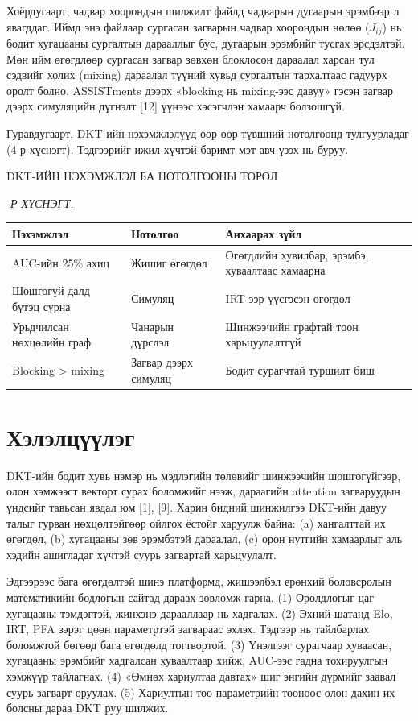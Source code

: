 \documentclass[10pt,twocolumn]{article}
\newcommand{\tabtitle}[1]{\refstepcounter{table}%
  {\centering\small\MakeUppercase{#1}\par}%
  {\raggedleft\small\itshape\thetable-Р ХҮСНЭГТ.\par}\vspace{2pt}}
\begin{document}
Хоёрдугаарт, чадвар хоорондын шилжилт файлд чадварын дугаарын эрэмбээр л явагддаг. Иймд энэ
файлаар сургасан загварын чадвар хоорондын нөлөө ($J_{ij}$) нь бодит хугацааны сургалтын
дарааллыг бус, дугаарын эрэмбийг тусгах эрсдэлтэй. Мөн ийм өгөгдлөөр сургасан загвар зөвхөн
блоклосон дараалал харсан тул сэдвийг холих (mixing) дараалал түүний хувьд сургалтын тархалтаас
гадуурх оролт болно. ASSISTments дээрх «blocking нь mixing-ээс давуу» гэсэн загвар дээрх
симуляцийн дүгнэлт [12] үүнээс хэсэгчлэн хамаарч болзошгүй.

Гуравдугаарт, DKT-ийн нэхэмжлэлүүд өөр өөр түвшний нотолгоонд тулгуурладаг (4-р хүснэгт).
Тэдгээрийг ижил хүчтэй баримт мэт авч үзэх нь буруу.

\begin{table}[t]
\tabtitle{DKT-ийн нэхэмжлэл ба нотолгооны төрөл}
\centering\small
\begin{tabular}{|L{2.2cm}|L{1.8cm}|L{3.0cm}|}
\hline
\textbf{Нэхэмжлэл} & \textbf{Нотолгоо} & \textbf{Анхаарах зүйл}\\\hline
AUC-ийн 25\% ахиц & Жишиг өгөгдөл & Өгөгдлийн хувилбар, эрэмбэ, хуваалтаас хамаарна\\\hline
Шошгогүй далд бүтэц сурна & Симуляц & IRT-ээр үүсгэсэн өгөгдөл\\\hline
Урьдчилсан нөхцөлийн граф & Чанарын дүрслэл & Шинжээчийн графтай тоон харьцуулалтгүй\\\hline
Blocking > mixing & Загвар дээрх симуляц & Бодит сурагчтай туршилт биш\\\hline
\end{tabular}
\end{table}

\section{Хэлэлцүүлэг}

DKT-ийн бодит хувь нэмэр нь мэдлэгийн төлөвийг шинжээчийн шошгогүйгээр, олон хэмжээст векторт
сурах боломжийг нээж, дараагийн attention загваруудын үндсийг тавьсан явдал юм [1], [9]. Харин
бидний шинжилгээ DKT-ийн давуу талыг гурван нөхцөлтэйгөөр ойлгох ёстойг харуулж байна: (a) хангалттай
их өгөгдөл, (b) хугацааны зөв эрэмбэтэй дараалал, (c) орон нутгийн хамаарлыг аль хэдийн
ашигладаг хүчтэй суурь загвартай харьцуулалт.

Эдгээрээс бага өгөгдөлтэй шинэ платформд, жишээлбэл ерөнхий боловсролын математикийн бодлогын
сайтад дараах зөвлөмж гарна. (1) Оролдлогыг цаг хугацааны тэмдэгтэй, жинхэнэ дарааллаар нь
хадгалах. (2) Эхний шатанд Elo, IRT, PFA зэрэг цөөн параметртэй загвараас эхлэх. Тэдгээр нь
тайлбарлах боломжтой бөгөөд бага өгөгдөлд тогтвортой. (3) Үнэлгээг сурагчаар хуваасан, хугацааны
эрэмбийг хадгалсан хуваалтаар хийж, AUC-ээс гадна тохируулгын хэмжүүр тайлагнах. (4) «Өмнөх хариултаа
давтах» шиг энгийн дүрмийг заавал суурь загварт оруулах. (5) Хариултын тоо параметрийн тооноос
олон дахин их болсны дараа DKT руу шилжих.
\end{document}
